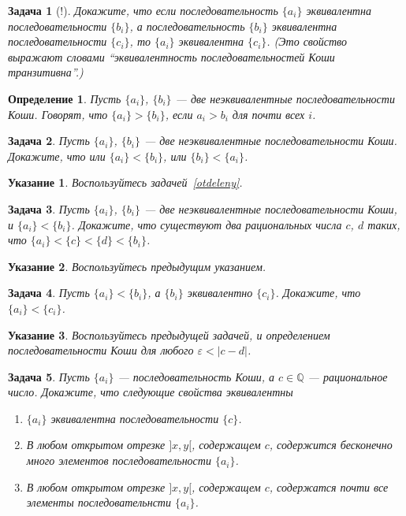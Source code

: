 \documentclass[12pt]{book}
\renewcommand{\epsilon}{\varepsilon}
\def\Q{{\mathbb Q}}
\theoremstyle{upshape}
\newtheorem{zadacha}{Задача}[chapter]
\theoremstyle{generic}
\newtheorem{opredelenie}[teorema]{Определение}
\theoremstyle{upshapenonumber}
\newtheorem{ukazanie}{Указание}[section]
\newcommand{\следствие}{%
     \refstepcounter{teorema}
     {\noindent\bf Следствие \thechapter.\arabic{teorema}:\ }}
\newcommand{\пример}{%
     \refstepcounter{teorema}
     {\noindent\bf Пример \thechapter.\arabic{teorema}:\ }}
\newcommand{\лемма}{%
     \refstepcounter{teorema}
     {\noindent\bf Лемма \thechapter.\arabic{teorema}:\ }}
\newcommand{\теорема}{%
     \refstepcounter{teorema}
     {\noindent\bf Теорема \thechapter.\arabic{teorema}:\ }}
\newcommand{\утверждение}{%
     \refstepcounter{teorema}
     {\noindent\bf Утверждение \thechapter.\arabic{teorema}:\ }}
\begin{document}
\begin{zadacha} [!] Докажите, что если последовательность $\{a_i\}$
эквивалентна последовательности $\{b_i\}$, а последовательность
$\{b_i\}$ эквивалентна последовательности $\{c_i\}$, то $\{a_i\}$
эквивалентна $\{c_i\}$. (Это свойство выражают словами
``эквивалентность последовательностей Коши транзитивна''.)
\end{zadacha}

\begin{opredelenie}
Пусть $\{a_i\}$, $\{b_i\}$ --- две неэквивалентные последовательности
Коши. Говорят, что $\{a_i\} > \{b_i\}$, если $a_i > b_i$ для почти
всех $i$.
\end{opredelenie}

\begin{zadacha}\label{order}
Пусть $\{a_i\}$, $\{b_i\}$ --- две неэквивалентные последовательности
Коши. Докажите, что или $\{a_i\} < \{b_i\}$, или $\{b_i\} <
\{a_i\}$.
\end{zadacha}

\begin{ukazanie}
Воспользуйтесь задачей~\ref{otdeleny}.
\end{ukazanie}

\begin{zadacha}\label{inte}
Пусть $\{a_i\}$, $\{b_i\}$ --- две неэквивалентные последовательности
Коши, и $\{a_i\} < \{b_i\}$. Докажите, что существуют два
рациональных числа $c$, $d$ таких, что $\{a_i\} < \{c\} <
  \{d\} < \{b_i\}$.
\end{zadacha}

\begin{ukazanie}
Воспользуйтесь предыдущим указанием.
\end{ukazanie}

\begin{zadacha}
Пусть $\{a_i\} < \{b_i\}$, а $\{b_i\}$ эквивалентно
$\{c_i\}$. Докажите, что $\{a_i\} < \{c_i\}$.
\end{zadacha}

\begin{ukazanie}
Воспользуйтесь предыдущей задачей, и определением последовательности
Коши для любого $\epsilon < |c-d|$.
\end{ukazanie}

\begin{zadacha} Пусть $\{ a_i\}$ --- последовательность
Коши, а $c\in \Q$ --- рациональное число.  Докажите, что следующие
свойства эквивалентны
\begin{enumerate}
\item $\{ a_i\}$ эквивалентна последовательности $\{c\}$.

\item В любом открытом отрезке $]x, y[$, содержащем $c$, содержится
бесконечно много элементов последовательности $\{ a_i\}$.

\item В любом открытом отрезке $]x, y[$, содержащем $c$, содержатся
почти все элементы последовательнсти $\{ a_i\}$.
\end{enumerate}
\end{zadacha}
\end{document}
